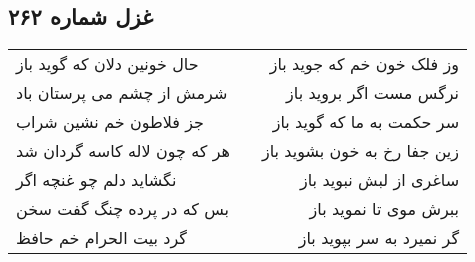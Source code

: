 \begin{center}
\section*{غزل شماره ۲۶۲}
\label{sec:sh262}
\begin{longtable}{l p{0.5cm} r}
حال خونین دلان که گوید باز
&&
وز فلک خون خم که جوید باز
\\
شرمش از چشم می پرستان باد
&&
نرگس مست اگر بروید باز
\\
جز فلاطون خم نشین شراب
&&
سر حکمت به ما که گوید باز
\\
هر که چون لاله کاسه گردان شد
&&
زین جفا رخ به خون بشوید باز
\\
نگشاید دلم چو غنچه اگر
&&
ساغری از لبش نبوید باز
\\
بس که در پرده چنگ گفت سخن
&&
ببرش موی تا نموید باز
\\
گرد بیت الحرام خم حافظ
&&
گر نمیرد به سر بپوید باز
\\
\end{longtable}
\end{center}

